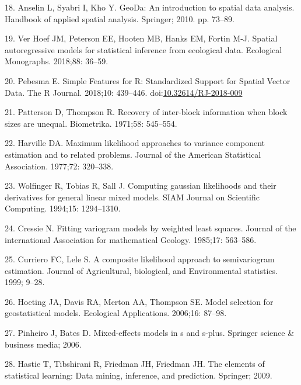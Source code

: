 \documentclass[10pt,letterpaper]{article}
\begin{document}
\leavevmode\hypertarget{ref-anselin2010geoda}{}%
18. Anselin L, Syabri I, Kho Y. GeoDa: An introduction to spatial data
analysis. Handbook of applied spatial analysis. Springer; 2010. pp.
73--89.

\leavevmode\hypertarget{ref-ver2018spatial}{}%
19. Ver Hoef JM, Peterson EE, Hooten MB, Hanks EM, Fortin M-J. Spatial
autoregressive models for statistical inference from ecological data.
Ecological Monographs. 2018;88: 36--59.

\leavevmode\hypertarget{ref-pebesma2018sf}{}%
20. Pebesma E. Simple Features for R: Standardized Support for Spatial
Vector Data. The R Journal. 2018;10: 439--446.
doi:\href{https://doi.org/10.32614/RJ-2018-009}{10.32614/RJ-2018-009}

\leavevmode\hypertarget{ref-patterson1971recovery}{}%
21. Patterson D, Thompson R. Recovery of inter-block information when
block sizes are unequal. Biometrika. 1971;58: 545--554.

\leavevmode\hypertarget{ref-harville1977maximum}{}%
22. Harville DA. Maximum likelihood approaches to variance component
estimation and to related problems. Journal of the American Statistical
Association. 1977;72: 320--338.

\leavevmode\hypertarget{ref-wolfinger1994computing}{}%
23. Wolfinger R, Tobias R, Sall J. Computing gaussian likelihoods and
their derivatives for general linear mixed models. SIAM Journal on
Scientific Computing. 1994;15: 1294--1310.

\leavevmode\hypertarget{ref-cressie1985fitting}{}%
24. Cressie N. Fitting variogram models by weighted least squares.
Journal of the international Association for mathematical Geology.
1985;17: 563--586.

\leavevmode\hypertarget{ref-curriero1999composite}{}%
25. Curriero FC, Lele S. A composite likelihood approach to
semivariogram estimation. Journal of Agricultural, biological, and
Environmental statistics. 1999; 9--28.

\leavevmode\hypertarget{ref-hoeting2006model}{}%
26. Hoeting JA, Davis RA, Merton AA, Thompson SE. Model selection for
geostatistical models. Ecological Applications. 2006;16: 87--98.

\leavevmode\hypertarget{ref-pinheiro2006mixed}{}%
27. Pinheiro J, Bates D. Mixed-effects models in s and s-plus. Springer
science \& business media; 2006.

\leavevmode\hypertarget{ref-hastie2009elements}{}%
28. Hastie T, Tibshirani R, Friedman JH, Friedman JH. The elements of
statistical learning: Data mining, inference, and prediction. Springer;
2009.
\end{document}
